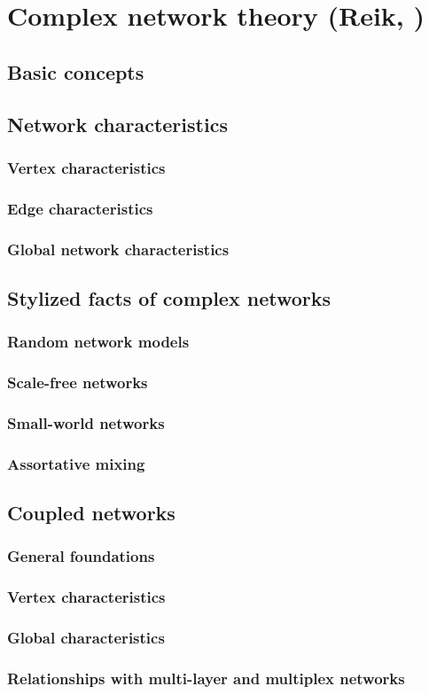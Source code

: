 \section{Complex network theory {\bf{(Reik, {\color{red}{in Appendix?}})}}}
	\subsection{Basic concepts}

	\subsection{Network characteristics}
 		\subsubsection{Vertex characteristics}
  		\subsubsection{Edge characteristics}
		\subsubsection{Global network characteristics}

	\subsection{Stylized facts of complex networks}
		\subsubsection{Random network models}
		\subsubsection{Scale-free networks}
		\subsubsection{Small-world networks}
		\subsubsection{Assortative mixing}

	\subsection{Coupled networks}
		\subsubsection{General foundations}
		\subsubsection{Vertex characteristics}
		\subsubsection{Global characteristics}
		\subsubsection{Relationships with multi-layer and multiplex networks}
